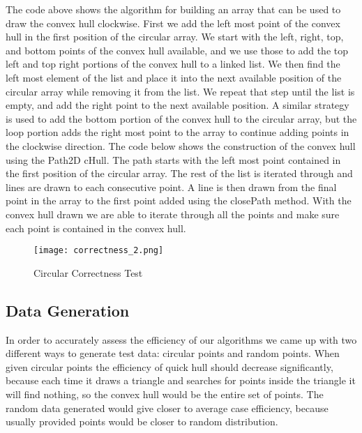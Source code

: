 \documentclass[a4paper, 12pt]{article}
\begin{document}
{  The code above shows the algorithm for building an array that can be used to draw the convex hull clockwise. First we add the left most point of the convex hull in the first position of the circular array. We start with the left, right, top, and bottom points of the convex hull available, and we use those to add the top left and top right portions of the convex hull to a linked list. We then find the left most element of the list and place it into the next available position of the circular array while removing it from the list. We repeat that step until the list is empty, and add the right point to the next available position. A similar strategy is used to add the bottom portion of the convex hull to the circular array, but the loop portion adds the right most point to the array to continue adding points in the clockwise direction. The code below shows the construction of the convex hull using the Path2D cHull. The path starts with the left most point contained in the first position of the circular array. The rest of the list is iterated through and lines are drawn to each consecutive point. A line is then drawn from the final point in the array to the first point added using the closePath method. With the convex hull drawn we are able to iterate through all the points and make sure each point is contained in the convex hull.
  \begin{figure}[H]
    \begin{center}
    \texttt{[image: correctness\_2.png]}
  \end{center}
    \caption{Circular Correctness Test}
    \label{fig:correctness_2}
  \end{figure} 

  \subsection{Data Generation}
  In order to accurately assess the efficiency of our algorithms we came up with two different ways to generate test data: circular points and random points. When given circular points the efficiency of quick hull should decrease significantly, because each time it draws a triangle and searches for points inside the triangle it will find nothing, so the convex hull would be the entire set of points. The random data generated would give closer to average case efficiency, because usually provided points would be closer to random distribution.
\\  

}
\end{document}
